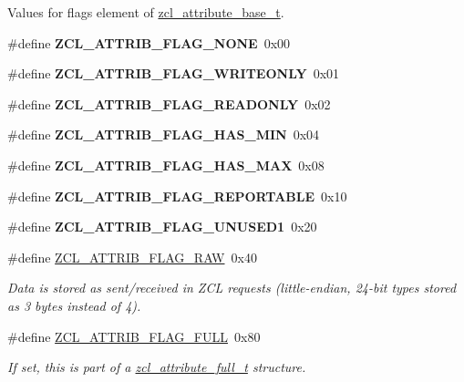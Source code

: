 Values for {\ttfamily flags} element of \hyperlink{structzcl__attribute__base__t}{zcl\+\_\+attribute\+\_\+base\+\_\+t}. \begin{DoxyCompactItemize}
\item 
\mbox{\label{group__zcl_gadfb37ba33684e81ca1bca08f0baa66dc}} 
\#define {\bfseries Z\+C\+L\+\_\+\+A\+T\+T\+R\+I\+B\+\_\+\+F\+L\+A\+G\+\_\+\+N\+O\+NE}~0x00
\item 
\mbox{\label{group__zcl_ga6103eeb5c0c701821394eab09d4fa9d3}} 
\#define {\bfseries Z\+C\+L\+\_\+\+A\+T\+T\+R\+I\+B\+\_\+\+F\+L\+A\+G\+\_\+\+W\+R\+I\+T\+E\+O\+N\+LY}~0x01
\item 
\mbox{\label{group__zcl_ga68b4663d5c6611aa5df04d77cde570f7}} 
\#define {\bfseries Z\+C\+L\+\_\+\+A\+T\+T\+R\+I\+B\+\_\+\+F\+L\+A\+G\+\_\+\+R\+E\+A\+D\+O\+N\+LY}~0x02
\item 
\mbox{\label{group__zcl_gad45fe12534c2dfca4475a5311c123612}} 
\#define {\bfseries Z\+C\+L\+\_\+\+A\+T\+T\+R\+I\+B\+\_\+\+F\+L\+A\+G\+\_\+\+H\+A\+S\+\_\+\+M\+IN}~0x04
\item 
\mbox{\label{group__zcl_ga9414f883d371589bd69a8508be794452}} 
\#define {\bfseries Z\+C\+L\+\_\+\+A\+T\+T\+R\+I\+B\+\_\+\+F\+L\+A\+G\+\_\+\+H\+A\+S\+\_\+\+M\+AX}~0x08
\item 
\mbox{\label{group__zcl_gab8576636338997753adc686493184f91}} 
\#define {\bfseries Z\+C\+L\+\_\+\+A\+T\+T\+R\+I\+B\+\_\+\+F\+L\+A\+G\+\_\+\+R\+E\+P\+O\+R\+T\+A\+B\+LE}~0x10
\item 
\mbox{\label{group__zcl_gab546a9b7cfef2d6f57b73b4e12ccf401}} 
\#define {\bfseries Z\+C\+L\+\_\+\+A\+T\+T\+R\+I\+B\+\_\+\+F\+L\+A\+G\+\_\+\+U\+N\+U\+S\+E\+D1}~0x20
\item 
\#define \hyperlink{group__zcl_gae40d06ea09e652f6c68fd13e61eb9624}{Z\+C\+L\+\_\+\+A\+T\+T\+R\+I\+B\+\_\+\+F\+L\+A\+G\+\_\+\+R\+AW}~0x40
\begin{DoxyCompactList}\small\item\em Data is stored as sent/received in Z\+CL requests (little-\/endian, 24-\/bit types stored as 3 bytes instead of 4). \end{DoxyCompactList}\item 
\mbox{\label{group__zcl_ga40104652d30fa17b7ea5dde9e8b788b8}} 
\#define \hyperlink{group__zcl_ga40104652d30fa17b7ea5dde9e8b788b8}{Z\+C\+L\+\_\+\+A\+T\+T\+R\+I\+B\+\_\+\+F\+L\+A\+G\+\_\+\+F\+U\+LL}~0x80
\begin{DoxyCompactList}\small\item\em If set, this is part of a \hyperlink{structzcl__attribute__full__t}{zcl\+\_\+attribute\+\_\+full\+\_\+t} structure. \end{DoxyCompactList}\end{DoxyCompactItemize}


